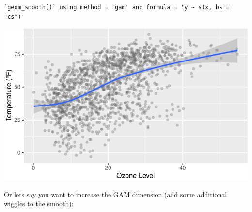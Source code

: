\documentclass[
  letterpaper,
  DIV=11,
  numbers=noendperiod]{scrreprt}
\begin{document}
\begin{verbatim}
`geom_smooth()` using method = 'gam' and formula = 'y ~ s(x, bs = "cs")'
\end{verbatim}

\includegraphics{ch17_files/figure-pdf/geom-stat-smooth-b-1.pdf}

Or lets say you want to increase the GAM dimension (add some additional
wiggles to the smooth):
\end{document}
